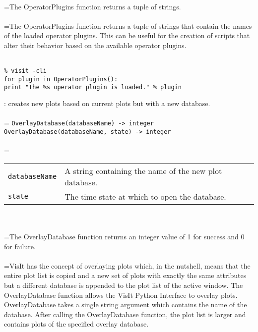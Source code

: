 \documentclass[10pt,a4paper]{report}
\begin{document}
 \\ 
\hangindent=\parindent The OperatorPlugins function returns a tuple of strings. \\[-3mm] 

 \\ 
\hangindent=\parindent The OperatorPlugins function returns a tuple of strings that contain the names of the loaded operator plugins. This can be useful for the creation of scripts that alter their behavior based on the available operator plugins. \\[-3mm] 

\\[-6mm]
\begin{verbatim}% visit -cli
for plugin in OperatorPlugins():
print "The %s operator plugin is loaded." % plugin
\end{verbatim}
\newpage


{}
: creates new plots based on current plots but with a new database.\\[-3mm]

 \\ 
\hangindent=\parindent 
\verb!OverlayDatabase(databaseName) -> integer!\\ 
\verb!OverlayDatabase(databaseName, state) -> integer!\\ [-3mm]

 \\ 
\hangindent=\parindent 
\begin{tabular}{lp{9cm}}
\verb!databaseName! & A string containing the name of the new plot database. \\
\verb!state! & The time state at which to open the database. \\
\end{tabular} \\[-2mm]


 \\ 
\hangindent=\parindent The OverlayDatabase function returns an integer value of 1 for success and 0 for failure. \\[-3mm] 

 \\ 
\hangindent=\parindent VisIt has the concept of overlaying plots which, in the nutshell, means that the entire plot list is copied and a new set of plots with exactly the same attributes but a different database is appended to the plot list of the active window. The OverlayDatabase function allows the VisIt Python Interface to overlay plots. OverlayDatabase takes a single string argument which contains the name of the database. After calling the OverlayDatabase function, the plot list is larger and contains plots of the specified overlay database. \\[-3mm] 
\end{document}
